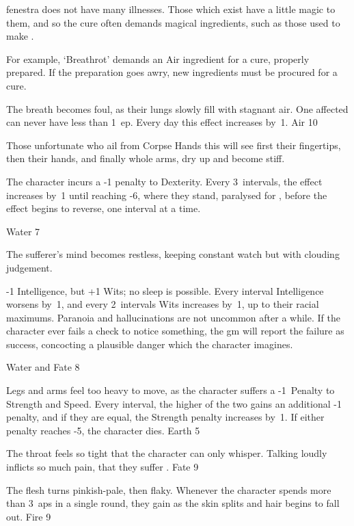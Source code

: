 \begin{multicols}{2}

\noindent
\Gls{fenestra} does not have many illnesses.
Those which exist have a little magic to them, and so the cure often demands magical \glspl{ingredient}, such as those used to make .

For example, `Breathrot' demands an Air \gls{ingredient} for a cure, properly prepared.
If the preparation goes awry, new \glspl{ingredient} must be procured for a cure.

%
  {
    The breath becomes foul, as their lungs slowly fill with stagnant air.
    One affected can never have less than 1~\gls{ep}.
    Every day this effect increases by~1.
  }%
  {Air}%
  {10}

%
  {
    Those unfortunate who ail from Corpse Hands this will see first their fingertips, then their hands, and finally whole arms, dry up and become stiff.

    The character incurs a -1 penalty to Dexterity.
    Every 3~\glspl{interval}, the effect increases by~1 until reaching -6, where they stand, paralysed for , before the effect begins to reverse, one \gls{interval} at a time.
  }%
  {Water}%
  {7}

%
  {The sufferer's mind becomes restless, keeping constant watch but with clouding judgement.

    -1 Intelligence, but +1 Wits; no sleep is possible.
    Every \gls{interval} Intelligence worsens by~1, and every 2~\glspl{interval} Wits increases by~1, up to their racial maximums.%
    Paranoia and hallucinations are not uncommon after a while.
    If the character ever fails a check to notice something, the \gls{gm} will report the failure as success, concocting a plausible danger which the character imagines.}%
  {Water and Fate}%
  {8}

%
  {Legs and arms feel too heavy to move, as the character suffers a -1~Penalty to Strength and Speed.
  Every \gls{interval}, the higher of the two gains an additional -1 penalty, and if they are equal, the Strength penalty increases by~1.
  If either penalty reaches -5, the character dies.}%
  {Earth}%
  {5}

%
  {The throat feels so tight that the character can only whisper.
  Talking loudly inflicts so much pain, that they suffer .}%
  {Fate}%
  {9}

%
  {The flesh turns pinkish-pale, then flaky.
  Whenever the character spends more than 3~\glspl{ap} in a single round, they gain  as the skin splits and hair begins to fall out.}%
  {Fire}%
  {9}

\end{multicols}
